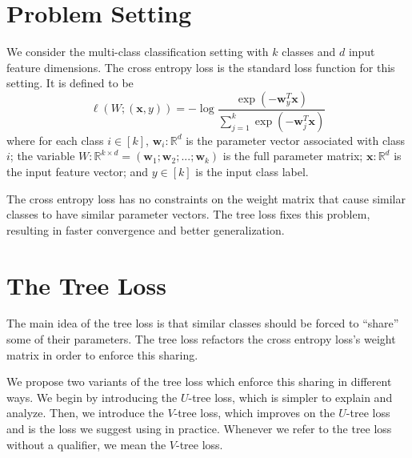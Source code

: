 \documentclass[twoside]{article}
\newcommand{\R}{\mathbb R}
\newcommand{\trans}[1]{{#1}^{T}}
\newcommand{\w}{\mathbf w}
\newcommand{\x}{\mathbf x}
\begin{document}
\section{Problem Setting}
\label{sec:tree}

We consider the multi-class classification setting with $k$ classes and $d$ input feature dimensions.
The cross entropy loss is the standard loss function for this setting.
It is defined to be
\begin{equation}
    \label{eq:xentropy}
    \ell(W;(\x,y)) = - \log \frac {\exp(-\trans\w_y \x)}{\sum_{j=1}^k \exp(-\trans \w_j \x)}
\end{equation}
where for each class $i\in[k]$,
$\w_i : \R^d$ is the parameter vector associated with class $i$;
the variable $W : \R^{k \times d} = (\w_1; \w_2; ...; \w_k)$ is the full parameter matrix;
$\x : \R^d$ is the input feature vector;
and $y \in [k]$ is the input class label.

The cross entropy loss has no constraints on the weight matrix that cause similar classes to have similar parameter vectors.
The tree loss fixes this problem, resulting in faster convergence and better generalization.

\section{The Tree Loss}

The main idea of the tree loss is that similar classes should be forced to ``share'' some of their parameters.
The tree loss refactors the cross entropy loss's weight matrix in order to enforce this sharing.

We propose two variants of the tree loss which enforce this sharing in different ways.
We begin by introducing the $U$-tree loss,
which is simpler to explain and analyze.
Then, we introduce the $V$-tree loss,
which improves on the $U$-tree loss and is the loss we suggest using in practice.
Whenever we refer to the tree loss without a qualifier,
we mean the $V$-tree loss.


\end{document}
